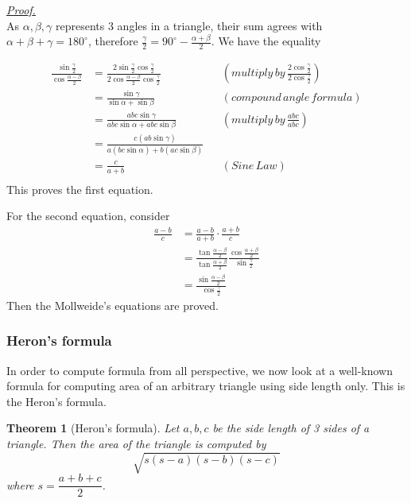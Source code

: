 \documentclass[12pt]{article}
\newtheorem*{theorem}{Theorem}
\renewenvironment{proof}[1][Proof]{\begin{snugshade*} \underline{\textit{{#1}.}}\\}{\hfill \qedsymbol \end{snugshade*}}
\begin{document}
    \begin{proof}
        As $\alpha,\beta,\gamma$ represents 3 angles in a triangle, their sum agrees with $\alpha+\beta+\gamma=180^\circ$, therefore $\frac{\gamma}{2}=90^\circ - \frac{\alpha+\beta}{2}$. We have the equality 
        
        \begin{align*}
            \frac{\sin{\frac{\gamma}{2}}}{\cos{\frac{\alpha-\beta}{2}}}&=\frac{2\sin{\frac{\gamma}{2}}\cos{\frac{\gamma}{2}}}{2\cos{\frac{\alpha-\beta}{2}}\cos{\frac{\gamma}{2}}}&&(multiply\, by\, \frac{2\cos{\frac{\gamma}{2}}}{2\cos{\frac{\gamma}{2}}})\\
            &=\frac{\sin{\gamma}}{\sin{\alpha}+\sin{\beta}}&&(compound\, angle\, formula)\\
            &=\frac{abc\sin{\gamma}}{abc\sin{\alpha}+abc\sin{\beta}}&&(multiply\, by\, \frac{abc}{abc})\\
            &=\frac{c(ab\sin{\gamma})}{a(bc\sin{\alpha})+b(ac\sin{\beta})}\\
            &=\frac{c}{a+b}&&(Sine\, Law)\\
        \end{align*}
        This proves the first equation.

        For the second equation, consider \begin{align*}
            \frac{a-b}{c}&=\frac{a-b}{a+b}\cdot \frac{a+b}{c}\\
            &=\frac{\tan{\frac{\alpha-\beta}{2}}}{\tan{\frac{\alpha+\beta}{2}}}\frac{\cos{\frac{\alpha+\beta}{2}}}{\sin{\frac{\gamma}{2}}}\\
            &=\frac{\sin{\frac{\alpha-\beta}{2}}}{\cos{\frac{\gamma}{2}}}
        \end{align*}
        Then the Mollweide's equations are proved.
    \end{proof}

    \subsubsection*{Heron's formula}

    In order to compute formula from all perspective, we now look at a well-known formula for computing area of an arbitrary triangle using side length only. This is the Heron's formula.

    \begin{theorem}[Heron's formula]
        Let $a,b,c$ be the side length of 3 sides of a triangle. Then the area of the triangle is computed by $$\sqrt{s(s-a)(s-b)(s-c)}$$where $s=\dfrac{a+b+c}{2}$.
    \end{theorem}
\end{document}
